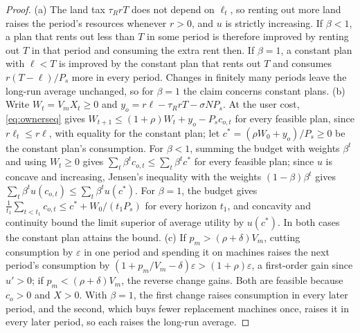 \documentclass[12pt]{article}
\theoremstyle{plain}
\theoremstyle{definition}
\theoremstyle{remark}
\begin{document}
\begin{proof}
(a) The land tax $\tau_RrT$ does not depend on $\ell_t$, so renting out more land raises the period's resources whenever $r>0$, and $u$ is strictly increasing. If $\beta<1$, a plan that rents out less than $T$ in some period is therefore improved by renting out $T$ in that period and consuming the extra rent then. If $\beta=1$, a constant plan with $\ell<T$ is improved by the constant plan that rents out $T$ and consumes $r(T-\ell)/P_s$ more in every period. Changes in finitely many periods leave the long-run average unchanged, so for $\beta=1$ the claim concerns constant plans.
(b) Write $W_t=V_mX_t\ge0$ and $y_o=r\ell-\tau_RrT-\sigma NP_s$. At the user cost, \eqref{eq:ownerseq} gives $W_{t+1}\le(1+\rho)W_t+y_o-P_sc_{o,t}$ for every feasible plan, since $r\ell_t\le r\ell$, with equality for the constant plan; let $c^*=(\rho W_0+y_o)/P_s\ge0$ be the constant plan's consumption. For $\beta<1$, summing the budget with weights $\beta^t$ and using $W_t\ge0$ gives $\sum_t\beta^tc_{o,t}\le\sum_t\beta^tc^*$ for every feasible plan; since $u$ is concave and increasing, Jensen's inequality with the weights $(1-\beta)\beta^t$ gives $\sum_t\beta^tu(c_{o,t})\le\sum_t\beta^tu(c^*)$. For $\beta=1$, the budget gives $\frac{1}{t_1}\sum_{t<t_1}c_{o,t}\le c^*+W_0/(t_1P_s)$ for every horizon $t_1$, and concavity and continuity bound the limit superior of average utility by $u(c^*)$. In both cases the constant plan attains the bound.
(c) If $p_m>(\rho+\delta)V_m$, cutting consumption by $\varepsilon$ in one period and spending it on machines raises the next period's consumption by $(1+p_m/V_m-\delta)\varepsilon>(1+\rho)\varepsilon$, a first-order gain since $u'>0$; if $p_m<(\rho+\delta)V_m$, the reverse change gains. Both are feasible because $c_o>0$ and $X>0$. With $\beta=1$, the first change raises consumption in every later period, and the second, which buys fewer replacement machines once, raises it in every later period, so each raises the long-run average.
\end{proof}
\end{document}

